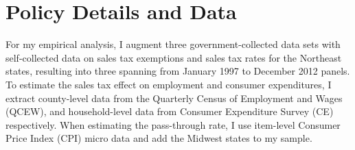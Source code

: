 \documentclass[12pt]{article}
\begin{document}
\begin{comment}
				\draw[thick, color=green] plot (\demandtwo) node[right] {$D_L(Q_i)$};
				
				\draw[thick, color=black] plot (\demandthree) node[right] {$D_L(Q_\tau)$};
				
				
				\draw[thick,color=purple] plot (\supply) node[right] {S};
				
				\draw[->] (0,0) -- (7.2,0) node[below] {$\textbf{Labor}$};
				\draw[->] (0,0) -- (0,6.2) node[right] {$\textbf{Wage}$};
				
				\draw[dashed] (2.6,2) -- (2.6,0) node[below] {$L(Q_\tau)$};
				\draw[dashed] (3.6,2) -- (3.6,0) node[below] {$L(Q_i)$}; 
				\draw[dashed] (5,2) -- (5,0) node[below] {$L(Q_e)$};        
				
				
				
				
				\end{tikzpicture}
				
				\caption{Employment change after tax exemption introduction}
				\medskip
				\begin{minipage}{1\textwidth}
					{ \small \emph{Notes:} Decrease in derived demand for employment generated by a sales tax is substantially larger when demand is elastic (blue line) rather than inelastic (green line). In the former case, the change equals $L(Q_e)-L(Q_\tau)$, whereas in the latter --- $L(Q_i)-L(Q_\tau)$}
				\end{minipage}	
				\label{fig:wl}
			\end{figure}
			
			
			\end{comment}		
			
			
			
			
	\section{Policy Details and Data}
			
	For my empirical analysis, I augment three government-collected data sets with self-collected data on sales tax exemptions and sales tax rates for the Northeast states, resulting into three spanning from January 1997 to December 2012 panels. To estimate the sales tax effect on employment and consumer expenditures, I extract county-level data from the Quarterly Census of Employment and Wages  (QCEW), and household-level data from Consumer Expenditure Survey (CE) respectively. When estimating the pass-through rate, I use item-level Consumer Price Index (CPI) micro data and add the Midwest states to my sample. 
	
\end{document}
